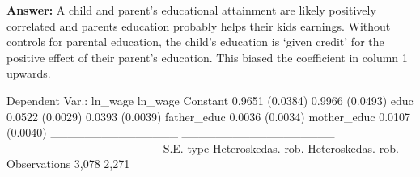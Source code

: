 \documentclass[12pt]{article}
\newcommand{\answer}[1]{{\color{blue_winged_teal}\textbf{Answer:} #1}}
\begin{document}
\begin{enumerate}
\begin{enumerate}
      \answer{A child and parent's educational attainment are likely positively correlated and parents education probably helps their kids earnings. Without controls for parental education, the child's education is `given credit' for the positive effect of their parent's education. This biased the coefficient in column 1 upwards.}
    \end{enumerate}

    \begin{codeblock}[{}]
Dependent Var.:            ln_wage              ln_wage
Constant           0.9651 (0.0384)      0.9966 (0.0493)
educ               0.0522 (0.0029)      0.0393 (0.0039)
father_educ                             0.0036 (0.0034)
mother_educ                             0.0107 (0.0040)
_______________ __________________   __________________
S.E. type       Heteroskedas.-rob.   Heteroskedas.-rob.
Observations                 3,078                2,271
    \end{codeblock}

\end{enumerate}
\end{document}
